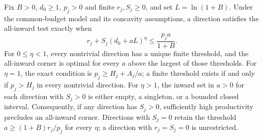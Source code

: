 \begin{proposition}
\label{prop:curvature}
Fix $B>0$, $d_0\geq1$, $p_j>0$ and finite $r_j,S_j\geq0$, and set
$L=\ln(1+B)$. Under the common-budget model and its concavity
assumptions, a direction satisfies the all-inward test exactly when
\begin{equation}
 r_j+S_j(d_0+aL)^\eta\leq\frac{p_j a}{1+B}.
 \label{eq:iso-corner}
\end{equation}
For $0\leq\eta<1$, every nontrivial direction has a unique finite
threshold, and the all-inward corner is optimal for every $a$ above the
largest of those thresholds. For $\eta=1$, the exact condition is
$p_j\geq H_j+A_j/a$; a finite threshold exists if and only if
$p_j>H_j$ in every nontrivial direction. For $\eta>1$, the inward set
in $a>0$ for each direction with $S_j>0$ is either empty, a singleton,
or a bounded closed interval. Consequently, if any direction has
$S_j>0$, sufficiently high productivity precludes an all-inward corner.
Directions with $S_j=0$ retain the threshold
$a\geq(1+B)r_j/p_j$ for every $\eta$; a direction with $r_j=S_j=0$
is unrestricted.
\end{proposition}

